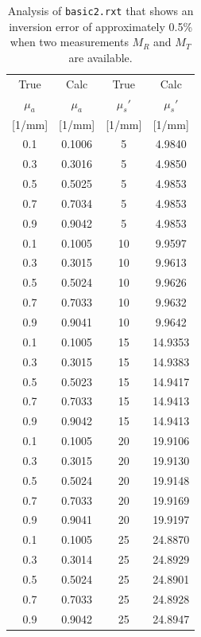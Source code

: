 \documentclass{article}
\begin{document}
\begin{table}[p]
\begin{center}
\begin{tabular}{cc|cc}
True & Calc & True & Calc\\
$\mu_a$ & $\mu_a$ & $\mu_s'$ & $\mu_s'$\\
\hbox{}[1/mm] & [1/mm] & [1/mm] & [1/mm]  \\
\hline
0.1 & 0.1006 & 5  & 4.9840  \\
0.3 & 0.3016 & 5  & 4.9850  \\
0.5 & 0.5025 & 5  & 4.9853 \\
0.7 & 0.7034 & 5  & 4.9853  \\
0.9 & 0.9042 & 5  & 4.9853  \\[2mm]
0.1 & 0.1005 & 10 & 9.9597  \\
0.3 & 0.3015 & 10 & 9.9613  \\
0.5 & 0.5024 & 10 & 9.9626  \\
0.7 & 0.7033 & 10 & 9.9632  \\
0.9 & 0.9041 & 10 & 9.9642  \\[2mm]
0.1 & 0.1005 & 15 & 14.9353  \\
0.3 & 0.3015 & 15 & 14.9383  \\
0.5 & 0.5023 & 15 & 14.9417  \\
0.7 & 0.7033 & 15 & 14.9413  \\
0.9 & 0.9042 & 15 & 14.9413  \\[2mm]
0.1 & 0.1005 & 20 & 19.9106  \\
0.3 & 0.3015 & 20 & 19.9130  \\
0.5 & 0.5024 & 20 & 19.9148 \\
0.7 & 0.7033 & 20 & 19.9169  \\
0.9 & 0.9041 & 20 & 19.9197  \\[2mm]
0.1 & 0.1005 & 25 & 24.8870  \\
0.3 & 0.3014 & 25 & 24.8929  \\
0.5 & 0.5024 & 25 & 24.8901  \\
0.7 & 0.7033 & 25 & 24.8928  \\
0.9 & 0.9042 & 25 & 24.8947  \\
\end{tabular}
\end{center}
\caption{Analysis of \texttt{basic2.rxt} that shows an inversion error
of approximately 0.5\% when two measurements $M_R$ and $M_T$
are available. }
\end{table}
\end{document}
